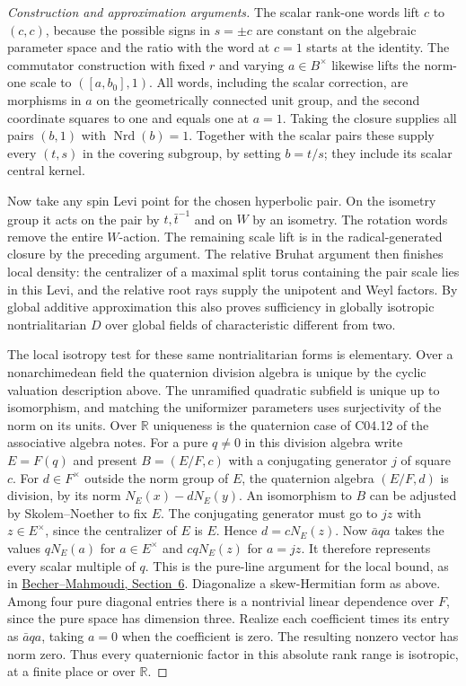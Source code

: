 \documentclass[11pt,a4paper,openany,oneside]{book}
\theoremstyle{resultstyle}
\theoremstyle{definition}
\numberwithin{equation}{chapter}
\begin{document}
\begin{proof}[Construction and approximation arguments]
The scalar rank-one words lift
\(c\) to \((c,c)\), because
the possible signs in \(s=\pm c\)
are constant on the algebraic
parameter space and the ratio
with the word at \(c=1\)
starts at the identity. The
commutator construction with
fixed \(r\) and varying
\(a\in B^\times\) likewise
lifts the norm-one scale to
\(([a,b_0],1)\). All words,
including the scalar correction,
are morphisms in \(a\) on
the geometrically connected
unit group, and the second
coordinate squares to one
and equals one at \(a=1\).
Taking the closure supplies
all pairs \((b,1)\) with
\(\operatorname{Nrd}(b)=1\).
Together with the scalar
pairs these supply every
\((t,s)\) in the covering
subgroup, by setting \(b=t/s\);
they include its scalar
central kernel.

Now take any spin Levi point
for the chosen hyperbolic
pair. On the isometry group
it acts on the pair by
\(t,\bar t^{-1}\) and on
\(W\) by an isometry.
The rotation words remove
the entire \(W\)-action.
The remaining scale lift
is in the radical-generated
closure by the preceding
argument. The relative
Bruhat argument then
finishes local density:
the centralizer of a
maximal split torus
containing the pair scale
lies in this Levi, and
the relative root rays
supply the unipotent and
Weyl factors. By global
additive approximation
this also proves sufficiency
in globally isotropic
nontrialitarian \(D\) over
global fields of characteristic
different from two.

The local isotropy test for these same
nontrialitarian forms is elementary. Over a
nonarchimedean field the quaternion division
algebra is unique by the cyclic valuation
description above. The unramified quadratic
subfield is unique up to isomorphism, and
matching the uniformizer parameters uses
surjectivity of the norm on its units.
Over \(\mathbb R\) uniqueness is the quaternion
case of C04.12 of the associative algebra
notes. For a pure \(q\ne0\) in this division
algebra write \(E=F(q)\) and present
\(B=(E/F,c)\) with a conjugating generator
\(j\) of square \(c\).
For \(d\in F^\times\) outside the norm group
of \(E\), the quaternion algebra \((E/F,d)\)
is division, by its norm
\(N_E(x)-dN_E(y)\).
An isomorphism to \(B\) can be adjusted
by Skolem--Noether to fix \(E\).
The conjugating generator must go to
\(jz\) with \(z\in E^\times\), since
the centralizer of \(E\) is \(E\).
Hence \(d=cN_E(z)\). Now
\(\bar a q a\) takes the values \(qN_E(a)\)
for \(a\in E^\times\) and \(cqN_E(z)\)
for \(a=jz\). It therefore represents
every scalar multiple of \(q\). This
is the pure-line argument for the
local bound, as in
\href{https://www.math.uni-bielefeld.de/LAG/man/188.pdf}
{Becher--Mahmoudi, Section~6}.
Diagonalize a skew-Hermitian form as
above. Among four pure diagonal
entries there is a nontrivial linear
dependence over \(F\), since the pure
space has dimension three. Realize
each coefficient times its entry
as \(\bar a q a\), taking \(a=0\)
when the coefficient is zero.
The resulting nonzero vector has
norm zero. Thus every quaternionic
factor in this absolute rank range
is isotropic, at a finite place or
over \(\mathbb R\).


\end{proof}
\end{document}
